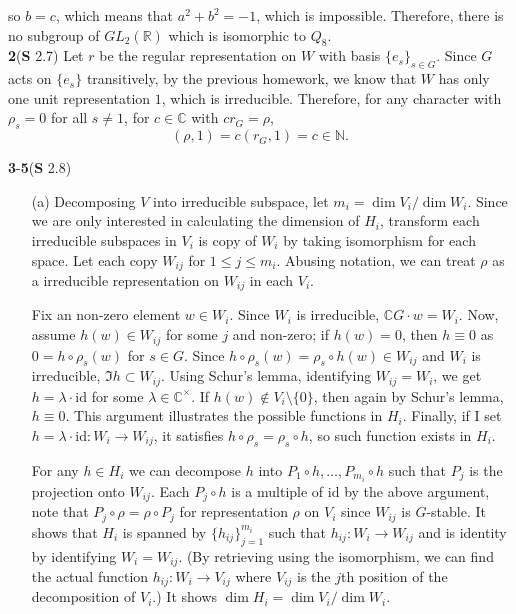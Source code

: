 \documentclass[a4paper, 12pt]{article}
\theoremstyle{Mydefinition}
\theoremstyle{Mytheorem}
\begin{document}
so $b=c$, which means that $a^2+b^2 = -1$, which is impossible. Therefore, there is no subgroup of $GL_2(\mathbb{R})$ which is isomorphic to $Q_8$.\\

\noindent \textbf{2}(\textbf{S} 2.7)
Let $r$ be the regular representation on $W$ with basis $\{e_s\}_{s\in G}$. Since $G$ acts on $\{e_s\}$ transitively, by the previous homework, we know that $W$ has only one unit representation $1$, which is irreducible. Therefore, for any character with $\rho_s = 0$ for all $s\neq 1$, for $c\in \mathbb{C}$ with $cr_G = \rho$,
\begin{equation}
    (\rho, 1) = c(r_G, 1) = c\in \mathbb{N}.
\end{equation}

\noindent \textbf{3}-\textbf{5}(\textbf{S} 2.8)
\begin{enumerate}
    \item[(a)] Decomposing $V$ into irreducible subspace, let $m_i = \dim V_i/\dim W_i$. Since we are only interested in calculating the dimension of $H_i$, transform each irreducible subspaces in $V_i$ is copy of $W_i$ by taking isomorphism for each space. Let each copy $W_{ij}$ for $1\leq j\leq m_i$. Abusing notation, we can treat $\rho$ as a irreducible representation on $W_{ij}$ in each $V_i$.
    
    Fix an non-zero element $w\in W_i$. Since $W_i$ is irreducible, $\mathbb{C}G\cdot w = W_i$. Now, assume $h(w)\in W_{ij}$ for some $j$ and non-zero; if $h(w) = 0$, then $h\equiv 0$ as $0 = h\circ \rho_s(w)$ for $s\in G$. Since $h\circ \rho_s(w) = \rho_s\circ h(w)\in W_{ij}$ and $W_i$ is irreducible, $\Im h\subset W_{ij}$. Using Schur's lemma, identifying $W_{ij}=W_i$, we get $h= \lambda\cdot \mathrm{id}$ for some $\lambda\in \mathbb{C}^\times$. If $h(w)\not\in V_i\setminus \{0\}$, then again by Schur's lemma, $h\equiv 0$. This argument illustrates the possible functions in $H_i$. Finally, if I set $h=\lambda\cdot\mathrm{id}:W_i\rightarrow W_{ij}$, it satisfies $h\circ \rho_s = \rho_s\circ h$, so such function exists in $H_i$.
    
    For any $h\in H_i$ we can decompose $h$ into $P_1\circ h, \ldots, P_{m_i}\circ h$ such that $P_j$ is the projection onto $W_{ij}$. Each $P_{j}\circ h$ is a multiple of $\mathrm{id}$ by the above argument, note that $P_j\circ \rho = \rho\circ P_j$ for representation $\rho$ on $V_i$ since $W_{ij}$ is $G$-stable. It shows that $H_i$ is spanned by $\{h_{ij}\}_{j=1}^{m_i}$ such that $h_{ij}:W_i\rightarrow W_{ij}$ and is identity by identifying $W_i = W_{ij}$. (By retrieving using the isomorphism, we can find the actual function $h_{ij}:W_i\rightarrow V_{ij}$ where $V_{ij}$ is the $j$th position of the decomposition of $V_i$.) It shows $\dim H_i = \dim V_i/\dim W_i$.
    

\end{enumerate}
\end{document}

